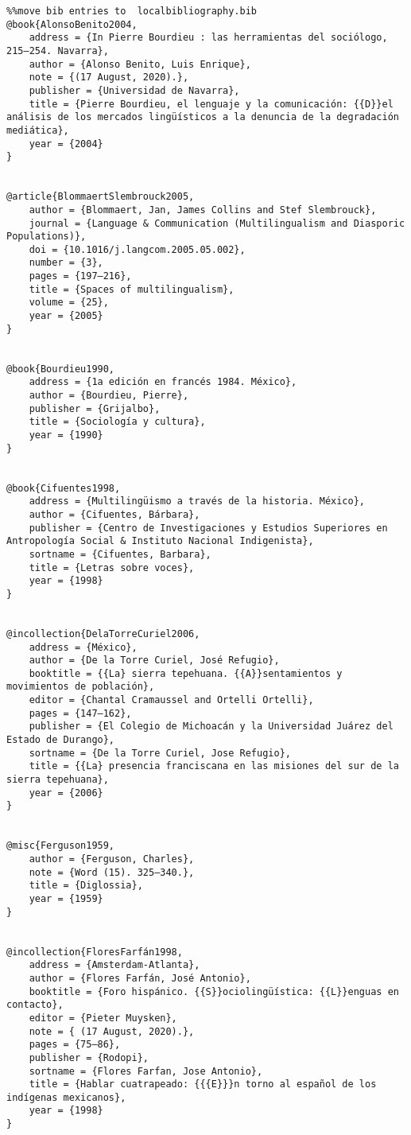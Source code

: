 \documentclass[output=paper]{../langscibook}
\begin{document}
\begin{verbatim}%%move bib entries to  localbibliography.bib
@book{AlonsoBenito2004,
	address = {In Pierre Bourdieu : las herramientas del sociólogo, 215–254. Navarra},
	author = {Alonso Benito, Luis Enrique},
	note = {(17 August, 2020).},
	publisher = {Universidad de Navarra},
	title = {Pierre Bourdieu, el lenguaje y la comunicación: {{D}}el análisis de los mercados lingüísticos a la denuncia de la degradación mediática},
	year = {2004}
}


@article{BlommaertSlembrouck2005,
	author = {Blommaert, Jan, James Collins and Stef Slembrouck},
	journal = {Language & Communication (Multilingualism and Diasporic Populations)},
	doi = {10.1016/j.langcom.2005.05.002},
	number = {3},
	pages = {197–216},
	title = {Spaces of multilingualism},
	volume = {25},
	year = {2005}
}


@book{Bourdieu1990,
	address = {1a edición en francés 1984. México},
	author = {Bourdieu, Pierre},
	publisher = {Grijalbo},
	title = {Sociología y cultura},
	year = {1990}
}


@book{Cifuentes1998,
	address = {Multilingüismo a través de la historia. México},
	author = {Cifuentes, Bárbara},
	publisher = {Centro de Investigaciones y Estudios Superiores en Antropología Social & Instituto Nacional Indigenista},
	sortname = {Cifuentes, Barbara},
	title = {Letras sobre voces},
	year = {1998}
}


@incollection{DelaTorreCuriel2006,
	address = {México},
	author = {De la Torre Curiel, José Refugio},
	booktitle = {{La} sierra tepehuana. {{A}}sentamientos y movimientos de población},
	editor = {Chantal Cramaussel and Ortelli Ortelli},
	pages = {147–162},
	publisher = {El Colegio de Michoacán y la Universidad Juárez del Estado de Durango},
	sortname = {De la Torre Curiel, Jose Refugio},
	title = {{La} presencia franciscana en las misiones del sur de la sierra tepehuana},
	year = {2006}
}


@misc{Ferguson1959,
	author = {Ferguson, Charles},
	note = {Word (15). 325–340.},
	title = {Diglossia},
	year = {1959}
}


@incollection{FloresFarfán1998,
	address = {Amsterdam-Atlanta},
	author = {Flores Farfán, José Antonio},
	booktitle = {Foro hispánico. {{S}}ociolingüística: {{L}}enguas en contacto},
	editor = {Pieter Muysken},
	note = { (17 August, 2020).},
	pages = {75–86},
	publisher = {Rodopi},
	sortname = {Flores Farfan, Jose Antonio},
	title = {Hablar cuatrapeado: {{{E}}}n torno al español de los indígenas mexicanos},
	year = {1998}
}



\end{verbatim}
\end{document}
